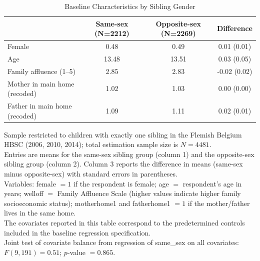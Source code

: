 \documentclass[12pt]{article}
\begin{document}
\begin{table}[htbp]\centering
\caption{Baseline Characteristics by Sibling Gender}
\label{tab:balance}
\begin{footnotesize}

\setlength{\tabcolsep}{4pt}

\begin{tabular*}{0.85\textwidth}{@{\extracolsep{\fill}}lccc}
\toprule
                    & Same-sex (N=2212) & Opposite-sex (N=2269) & Difference \\
\midrule
Female              & 0.48 & 0.49 & 0.01 (0.01) \\
Age                 & 13.48 & 13.51 & 0.03 (0.05) \\
Family affluence (1–5) & 2.85 & 2.83 & -0.02 (0.02) \\
Mother in main home (recoded) & 1.02 & 1.03 & 0.00 (0.00) \\
Father in main home (recoded) & 1.09 & 1.11 & 0.02 (0.01) \\
\bottomrule
\end{tabular*}

\vspace{0.3em}
\begin{minipage}{0.85\textwidth}
\footnotesize
\setlength{\parindent}{0pt}
\raggedright
Sample restricted to children with exactly one sibling in the Flemish Belgium
HBSC (2006, 2010, 2014); total estimation sample size is $N=4481$.\\
Entries are means for the same-sex sibling group (column 1) and the
opposite-sex sibling group (column 2). Column 3 reports the difference
in means (same-sex minus opposite-sex) with standard errors in parentheses.\\
Variables: female $=1$ if the respondent is female; age $=$ respondent's
age in years; welloff $=$ Family Affluence Scale (higher values indicate
higher family socioeconomic status); motherhome1 and fatherhome1 $=1$ if
the mother/father lives in the same home.\\
The covariates reported in this table correspond to the predetermined
controls included in the baseline regression specification.\\
Joint test of covariate balance from regression of same\_sex on all
covariates: $F(9,191)=0.51$; $p$-value $=0.865$.
\end{minipage}

\end{footnotesize}
\end{table}
\end{document}

